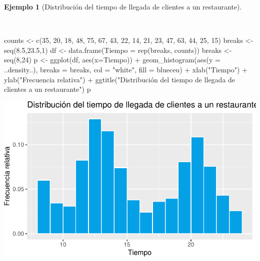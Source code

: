 \documentclass[
  a4paper,
]{scrreport}
\newenvironment{Shaded}{\begin{snugshade}}{\end{snugshade}}
\newcommand{\AttributeTok}[1]{\textcolor[rgb]{0.40,0.45,0.13}{#1}}
\newcommand{\DecValTok}[1]{\textcolor[rgb]{0.68,0.00,0.00}{#1}}
\newcommand{\FloatTok}[1]{\textcolor[rgb]{0.68,0.00,0.00}{#1}}
\newcommand{\FunctionTok}[1]{\textcolor[rgb]{0.28,0.35,0.67}{#1}}
\newcommand{\NormalTok}[1]{\textcolor[rgb]{0.00,0.23,0.31}{#1}}
\newcommand{\OtherTok}[1]{\textcolor[rgb]{0.00,0.23,0.31}{#1}}
\newcommand{\SpecialCharTok}[1]{\textcolor[rgb]{0.37,0.37,0.37}{#1}}
\newcommand{\StringTok}[1]{\textcolor[rgb]{0.13,0.47,0.30}{#1}}
\theoremstyle{plain}
\theoremstyle{definition}
\theoremstyle{definition}
\newtheorem{example}{Ejemplo}[chapter]
\theoremstyle{remark}
\begin{document}
\begin{example}[Distribución del tiempo de llegada de clientes a un
restaurante]\protect\hypertarget{exm-distribucion-llegada-clientes-restaurantes}{}\label{exm-distribucion-llegada-clientes-restaurantes}

~

\begin{Shaded}
\begin{Highlighting}[]
\NormalTok{counts }\OtherTok{\textless{}{-}} \FunctionTok{c}\NormalTok{(}\DecValTok{35}\NormalTok{, }\DecValTok{20}\NormalTok{, }\DecValTok{18}\NormalTok{, }\DecValTok{48}\NormalTok{, }\DecValTok{75}\NormalTok{, }\DecValTok{67}\NormalTok{, }\DecValTok{43}\NormalTok{, }\DecValTok{22}\NormalTok{, }\DecValTok{14}\NormalTok{, }\DecValTok{21}\NormalTok{, }\DecValTok{23}\NormalTok{, }\DecValTok{47}\NormalTok{, }\DecValTok{63}\NormalTok{, }\DecValTok{44}\NormalTok{, }\DecValTok{25}\NormalTok{, }\DecValTok{15}\NormalTok{)}
\NormalTok{breaks }\OtherTok{\textless{}{-}} \FunctionTok{seq}\NormalTok{(}\FloatTok{8.5}\NormalTok{,}\FloatTok{23.5}\NormalTok{,}\DecValTok{1}\NormalTok{)}
\NormalTok{df }\OtherTok{\textless{}{-}} \FunctionTok{data.frame}\NormalTok{(}\AttributeTok{Tiempo =} \FunctionTok{rep}\NormalTok{(breaks, counts))}
\NormalTok{breaks }\OtherTok{\textless{}{-}} \FunctionTok{seq}\NormalTok{(}\DecValTok{8}\NormalTok{,}\DecValTok{24}\NormalTok{)}
\NormalTok{p }\OtherTok{\textless{}{-}} \FunctionTok{ggplot}\NormalTok{(df, }\FunctionTok{aes}\NormalTok{(}\AttributeTok{x=}\NormalTok{Tiempo)) }\SpecialCharTok{+}
    \FunctionTok{geom\_histogram}\NormalTok{(}\FunctionTok{aes}\NormalTok{(}\AttributeTok{y =}\NormalTok{ ..density..), }\AttributeTok{breaks =}\NormalTok{ breaks, }\AttributeTok{col =} \StringTok{"white"}\NormalTok{, }\AttributeTok{fill =}\NormalTok{ blueceu) }\SpecialCharTok{+}
    \FunctionTok{xlab}\NormalTok{(}\StringTok{"Tiempo"}\NormalTok{) }\SpecialCharTok{+}
    \FunctionTok{ylab}\NormalTok{(}\StringTok{"Frecuencia relativa"}\NormalTok{) }\SpecialCharTok{+}
    \FunctionTok{ggtitle}\NormalTok{(}\StringTok{"Distribución del tiempo de llegada de clientes a un restaurante"}\NormalTok{)}
\NormalTok{p}
\end{Highlighting}
\end{Shaded}

\includegraphics{02-estadistica-descriptiva_files/figure-pdf/histograma-tiempo-llegada-restaurante-1.pdf}

\end{example}
\end{document}
